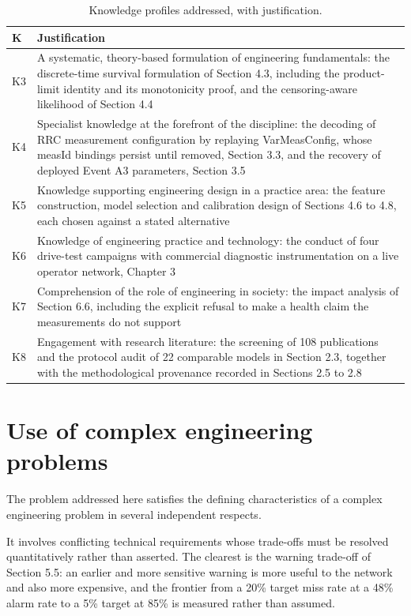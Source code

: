 \begin{table}[htbp]
\centering
\caption{Knowledge profiles addressed, with justification.}
\label{tab:6_3}
\vspace{0.4em}
\singlespacing
\small
\begin{tabularx}{\linewidth}{l X}
\toprule
\textbf{K} & \textbf{Justification} \\
\midrule
K3 & A systematic, theory-based formulation of engineering fundamentals: the discrete-time survival formulation of Section 4.3, including the product-limit identity and its monotonicity proof, and the censoring-aware likelihood of Section 4.4 \\
K4 & Specialist knowledge at the forefront of the discipline: the decoding of RRC measurement configuration by replaying VarMeasConfig, whose measId bindings persist until removed, Section 3.3, and the recovery of deployed Event A3 parameters, Section 3.5 \\
K5 & Knowledge supporting engineering design in a practice area: the feature construction, model selection and calibration design of Sections 4.6 to 4.8, each chosen against a stated alternative \\
K6 & Knowledge of engineering practice and technology: the conduct of four drive-test campaigns with commercial diagnostic instrumentation on a live operator network, Chapter 3 \\
K7 & Comprehension of the role of engineering in society: the impact analysis of Section 6.6, including the explicit refusal to make a health claim the measurements do not support \\
K8 & Engagement with research literature: the screening of 108 publications and the protocol audit of 22 comparable models in Section 2.3, together with the methodological provenance recorded in Sections 2.5 to 2.8 \\
\bottomrule
\end{tabularx}
\end{table}


\section{Use of complex engineering problems}
\label{sec:6_5}

The problem addressed here satisfies the defining characteristics of a complex engineering problem in several independent respects.

It involves conflicting technical requirements whose trade-offs must be resolved quantitatively rather than asserted. The clearest is the warning trade-off of Section 5.5: an earlier and more sensitive warning is more useful to the network and also more expensive, and the frontier from a 20\% target miss rate at a 48\% alarm rate to a 5\% target at 85\% is measured rather than assumed.

